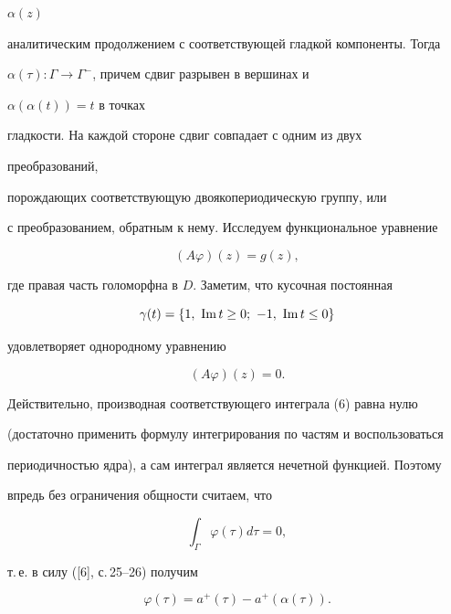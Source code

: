 $\alpha(z)$ 


аналитическим продолжением с соответствующей гладкой компоненты. Тогда 


$\alpha(\tau):\Gamma\to\Gamma^-$, причем сдвиг разрывен в вершинах и 


$\alpha(\alpha(t))=t$ в точках  


гладкости. На каждой стороне сдвиг совпадает с одним из двух 


преобразований,  


порождающих соответствующую двоякопериодическую группу, или  


с преобразованием, обратным к нему. Исследуем функциональное уравнение 


\begin{equation} 


(A\varphi)(z)=g(z), 


\end{equation} 


где правая часть голоморфна в $D$. Заметим, что кусочная постоянная 


$$ 


\gamma(t)=\{1,\ \im t\ge0;\ -1,\ \im t\le0\} 


$$ 


удовлетворяет однородному уравнению 


\begin{equation} 


(A\varphi)(z)=0. 


\end{equation} 


Действительно, производная соответствующего интеграла (6) равна нулю  


(достаточно применить формулу интегрирования по частям и воспользоваться  


периодичностью ядра), а сам интеграл является нечетной функцией. Поэтому  


впредь без ограничения общности считаем, что 


\begin{equation} 


\int_\Gamma \varphi(\tau)d\tau=0, 


\end{equation} 


т.\,е. в силу ([6], с.\,25--26) получим 


\begin{equation} 


\varphi(\tau)=a^+(\tau)-a^+(\alpha(\tau)). 


\end{equation} 


